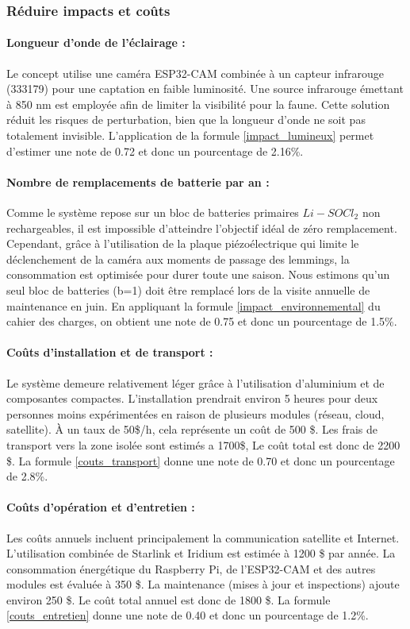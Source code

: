 \subsubsection{Réduire impacts et coûts}

\paragraph{Longueur d'onde de l'éclairage :}
Le concept utilise une caméra ESP32-CAM combinée à un capteur infrarouge (333179) pour une captation en faible luminosité. 
Une source infrarouge émettant à 850 nm est employée afin de limiter la visibilité pour la faune.
Cette solution réduit les risques de perturbation, bien que la longueur d’onde ne soit pas totalement invisible.
L’application de la formule \ref{impact_lumineux} permet d’estimer une note de 0.72 et donc un pourcentage de 2.16\%.

\paragraph{Nombre de remplacements de batterie par an :}
Comme le système repose sur un bloc de batteries primaires $Li-SOCl_2$ non rechargeables, il est impossible d’atteindre l’objectif idéal de zéro remplacement.
Cependant, grâce à l'utilisation de la plaque piézoélectrique qui limite le déclenchement de la caméra aux moments de passage des lemmings, la consommation est optimisée pour durer toute une saison.
Nous estimons qu'un seul bloc de batteries (b=1) doit être remplacé lors de la visite annuelle de maintenance en juin. 
En appliquant la formule \ref{impact_environnemental} du cahier des charges, on obtient une note de 0.75 et donc un pourcentage de 1.5\%.


\paragraph{Coûts d'installation et de transport :}
Le système demeure relativement léger grâce à l’utilisation d’aluminium et de composantes compactes.
L'installation prendrait environ 5 heures pour deux personnes moins expérimentées en raison de plusieurs modules (réseau, cloud, satellite).
À un taux de 50\$/h, cela représente un coût de 500 \$.
Les frais de transport vers la zone isolée sont estimés a 1700\$, Le coût total est donc de 2200 \$.
La formule \ref{couts_transport} donne une note de 0.70 et donc un pourcentage de 2.8\%.

\paragraph{Coûts d'opération et d'entretien :}
Les coûts annuels incluent principalement la communication satellite et Internet.
L’utilisation combinée de Starlink et Iridium est estimée à 1200 \$ par année.
La consommation énergétique du Raspberry Pi, de l’ESP32-CAM et des autres modules est évaluée à 350 \$.
La maintenance (mises à jour et inspections) ajoute environ 250 \$.
Le coût total annuel est donc de 1800 \$.
La formule \ref{couts_entretien} donne une note de  0.40 et donc un pourcentage de 1.2\%.

